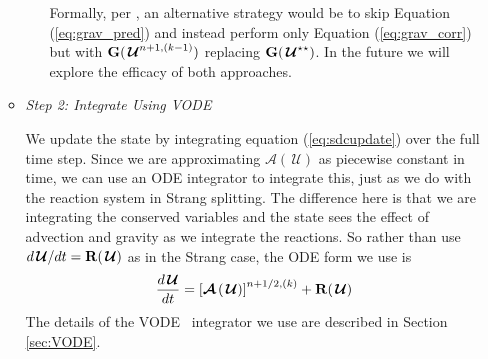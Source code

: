 \documentclass[linenumbers]{aastex631}
\newcommand{\omegadot}{\dot{\omega}}
\newcommand{\odt}[1]{{\frac{{d#1}}{dt}}}
\newcommand{\Uc}{{\,\bm{\mathcal{U}}}}
\newcommand{\Gb}{{\bf G}}
\newcommand{\Rb}{{\bf R}}
\newcommand{\Adv}[1]{{\left [\boldsymbol{\mathcal{A}} \left(#1\right)\right]}}
\newcommand{\MarginPar}[1]{\marginpar{\vskip-\baselineskip\raggedright\tiny\sffamily\hrule\smallskip{\color{red}#1}\par\smallskip\hrule}}
\begin{document}
\begin{itemize}
\begin{itemize}
\begin{itemize}
    Formally, per \cite{SDC-old}, an alternative strategy would be to skip Equation (\ref{eq:grav_pred}) and instead
    perform only Equation (\ref{eq:grav_corr}) but with $\Gb(\Uc^{n+1,(k-1)})$ replacing $\Gb(\Uc^{\star\star})$.
    In the future we will explore the efficacy of both approaches.

    \end{itemize}

  \item {\em Step 2: Integrate Using VODE}

    We update the state by integrating equation
    (\ref{eq:sdcupdate}) over the full time step.  Since we are approximating
    $\boldsymbol{\mathcal{A}}(\Uc)$ as piecewise constant in time, we can use an
    ODE integrator to integrate this, just as we do with the reaction
    system in Strang splitting.  The difference here is that we are
    integrating the conserved variables and the state sees the effect
    of advection and gravity as we integrate the reactions.  So rather than use
    $d\Uc/dt = \Rb(\Uc)$ as in the Strang case, the ODE form we use is
    \begin{equation}
      \odt{\Uc} = \Adv{\Uc}^{n+1/2,(k)} + \Rb(\Uc)
    \end{equation}
    The details of the VODE~\citep{vode} integrator we use are
    described in Section \ref{sec:VODE}.
    

\end{itemize}
\end{itemize}
\end{document}
